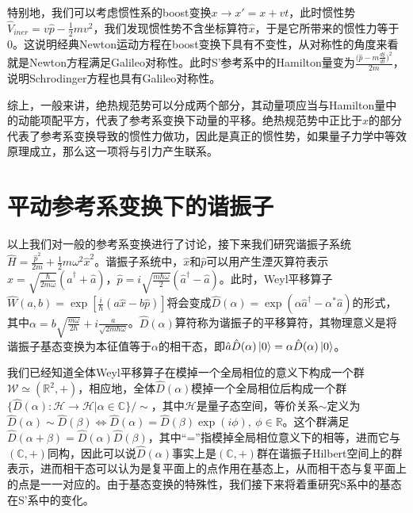 \documentclass[a4paper]{article}
\begin{document}
        特别地，我们可以考虑惯性系的boost变换$x\rightarrow x'=x+vt$，此时惯性势$\hat{V}_{iner}=v\hat{p}-\frac{1}{2}mv^2$，我们发现惯性势不含坐标算符$\hat{x}$，于是它所带来的惯性力等于0。这说明经典Newton运动方程在boost变换下具有不变性，从对称性的角度来看就是Newton方程满足Galileo对称性。此时S'参考系中的Hamilton量变为$\frac{\big(\hat{p}-m\frac{d\xi}{dt}\big)^2}{2m}$，说明Schrodinger方程也具有Galileo对称性。

        综上，一般来讲，绝热规范势可以分成两个部分，其动量项应当与Hamilton量中的动能项配平方，代表了参考系变换下动量的平移。绝热规范势中正比于$\hat{x}$的部分代表了参考系变换导致的惯性力做功，因此是真正的惯性势，如果量子力学中等效原理成立，那么这一项将与引力产生联系。


    
    \section{平动参考系变换下的谐振子}

        以上我们对一般的参考系变换进行了讨论，接下来我们研究谐振子系统$\hat{H}=\frac{\hat{p}^2}{2m}+\frac{1}{2}m\omega^2\hat{x}^2$。谐振子系统中，$\hat{x}$和$\hat{p}$可以用产生湮灭算符表示$\hat{x}=\sqrt{\frac{\hbar}{2m\omega}}(\hat{a}^\dagger+\hat{a})$，$\hat{p}=i\sqrt{\frac{m\hbar\omega}{2}}(\hat{a}^\dagger-\hat{a})$。此时，Weyl平移算子$\hat{W}(a,b)=\exp[\frac{i}{\hbar}(a\hat{x}-b\hat{p})]$将会变成$\hat{D}(\alpha)=\exp(\alpha\hat{a}^\dagger-\alpha^*\hat{a})$的形式，其中$\alpha=b\sqrt{\frac{m\omega}{2\hbar}}+i\frac{a}{\sqrt{2m\hbar\omega}}$。$\hat{D}(\alpha)$算符称为谐振子的平移算符，其物理意义是将谐振子基态变换为本征值等于$\alpha$的相干态，即$\hat{a}\hat{D}(\alpha)\ket{0}=\alpha\hat{D}(\alpha)\ket{0}$。

        我们已经知道全体Weyl平移算子在模掉一个全局相位的意义下构成一个群$\mathcal{W}\simeq(\mathbb{R}^2,+)$，相应地，全体$\hat{D}(\alpha)$模掉一个全局相位后构成一个群$\{\hat{D}(\alpha):\mathcal{H}\to\mathcal{H}|\alpha\in\mathbb{C}\}/\sim$，其中$\mathcal{H}$是量子态空间，等价关系$\sim$定义为$\hat{D}(\alpha)\sim\hat{D}(\beta) \Leftrightarrow \hat{D}(\alpha)=\hat{D}(\beta)\exp(i\phi),\ \phi\in\mathbb{R}$。这个群满足$\hat{D}(\alpha+\beta)=\hat{D}(\alpha)\hat{D}(\beta)$，其中“=”指模掉全局相位意义下的相等，进而它与$(\mathbb{C},+)$同构，因此可以说$\hat{D}(\alpha)$事实上是$(\mathbb{C},+)$群在谐振子Hilbert空间上的群表示，进而相干态可以认为是复平面上的点作用在基态上，从而相干态与复平面上的点是一一对应的。由于基态变换的特殊性，我们接下来将着重研究S系中的基态在S'系中的变化。
\end{document}
